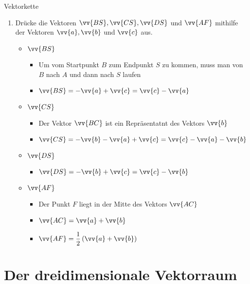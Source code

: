\begin{bsp}{Vektorkette}{}
\begin{enumerate}
\begin{itemize}
        \item aber nicht \textcolor{red}{parallel} zu $\vv{c}$
    \end{itemize}
    \item Drücke die Vektoren $\vv{BS}, \vv{CS}, \vv{DS}$ und $\vv{AF}$ mithilfe der Vektoren $\vv{a}, \vv{b}$ und $\vv{
    c}$ aus.
    \begin{itemize}
        \item $\vv{BS}$
        \begin{itemize}
            \item Um vom Startpunkt $B$ zum Endpunkt $S$ zu kommen, muss man von $B$ nach $A$ und dann nach $S$ \glqq laufen\grqq{}
            \item $\vv{BS} = -\vv{a} + \vv{c} = \vv{c} - \vv{a}$
        \end{itemize}       
        \item $\vv{CS}$ 
        \begin{itemize}
            \item Der Vektor $\vv{BC}$ ist ein Repräsentatnt des Vektors $\vv{b}$ 
            \item $\vv{CS} = -\vv{b} - \vv{a} + \vv{c} = \vv{c} - \vv{a} -\vv{b}$
        \end{itemize}
        \item $\vv{DS}$ 
        \begin{itemize}
            \item $\vv{DS} = -\vv{b} + \vv{c} = \vv{c} - \vv{b}$
        \end{itemize}
         \item $\vv{AF}$ 
         \begin{itemize}
             \item Der Punkt $F$ liegt in der Mitte des Vektors $\vv{AC}$
             \item $\vv{AC} = \vv{a} + \vv{b}$
             \item $\vv{AF} = \dfrac{1}{2} \left(\vv{a} + \vv{b} \right)$
         \end{itemize}
    \end{itemize}
\end{enumerate}
\end{bsp}
\section{Der dreidimensionale Vektorraum}